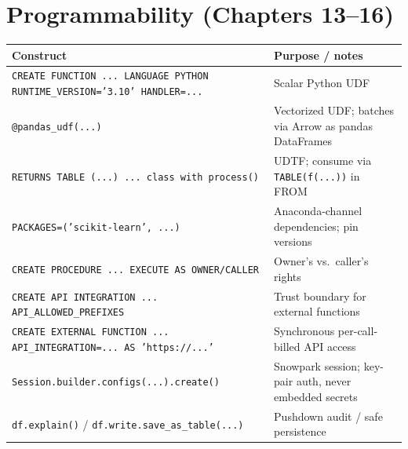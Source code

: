 \section{Programmability (Chapters 13--16)}
\begin{center}
\footnotesize
\begin{tabular}{@{}p{5.6cm}p{8.6cm}@{}}
\toprule
\textbf{Construct} & \textbf{Purpose / notes} \\
\midrule
\texttt{CREATE FUNCTION ... LANGUAGE PYTHON RUNTIME\_VERSION='3.10' HANDLER=...} & Scalar Python UDF \\
\texttt{@pandas\_udf(...)} & Vectorized UDF; batches via Arrow as pandas DataFrames \\
\texttt{RETURNS TABLE (...) ... class with process()} & UDTF; consume via \texttt{TABLE(f(...))} in FROM \\
\texttt{PACKAGES=('scikit-learn', ...)} & Anaconda-channel dependencies; pin versions \\
\texttt{CREATE PROCEDURE ... EXECUTE AS OWNER/CALLER} & Owner's vs.\ caller's rights \\
\texttt{CREATE API INTEGRATION ... API\_ALLOWED\_PREFIXES} & Trust boundary for external functions \\
\texttt{CREATE EXTERNAL FUNCTION ... API\_INTEGRATION=... AS 'https://...'} & Synchronous per-call-billed API access \\
\texttt{Session.builder.configs(...).create()} & Snowpark session; key-pair auth, never embedded secrets \\
\texttt{df.explain()} / \texttt{df.write.save\_as\_table(...)} & Pushdown audit / safe persistence \\
\bottomrule
\end{tabular}
\end{center}

